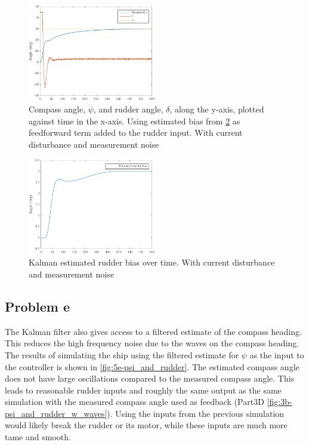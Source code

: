 \begin{figure}[ht]
    \centering
    \includegraphics[width=0.5\textwidth]{images/5d-psi_and_rudder}
    \caption{Compass angle, $\psi$, and rudder angle, $\delta$, along the y-axis, plotted against time in the x-axis. Using estimated bias from \cref{fig:5d-estimated_rudder_bias} as feedforward term added to the rudder input. With current disturbance and measurement noise}
    \label{fig:5d-psi_and_rudder}
\end{figure}

\begin{figure}[ht]
    \centering
    \includegraphics[width=0.5\textwidth]{images/5d-estimated_rudder_bias}
    \caption{Kalman estimated rudder bias over time. With current disturbance and measurement noise}
    \label{fig:5d-estimated_rudder_bias}
\end{figure}

\subsection{Problem e}
The Kalman filter also gives access to a filtered estimate of the compass heading. This reduces the high frequency noise due to the waves on the compass heading. The results of simulating the ship using the filtered estimate for $\psi$ as the input to the controller is shown in \cref{fig:5e-psi_and_rudder}. The estimated compass angle does not have large oscillations compared to the measured compass angle. This leads to reasonable rudder inputs and roughly the same output as the same simulation with the measured compass angle used as feedback (Part3D \cref{fig:3b-psi_and_rudder_w_waves}). Using the inputs from the previous simulation would likely break the rudder or its motor, while these inputs are much more tame and smooth.

